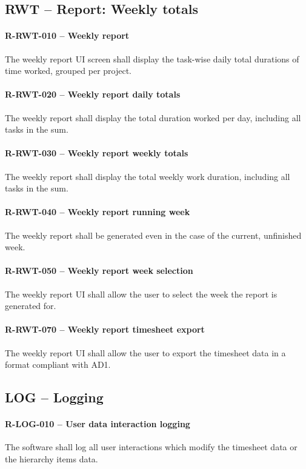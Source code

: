 \subsection{RWT -- Report: Weekly totals}
\paragraph{R-RWT-010 -- Weekly report}
The weekly report \gls{UI} screen shall display the task-wise daily total
durations of time worked, grouped per project.

\paragraph{R-RWT-020 -- Weekly report daily totals}
The weekly report shall display the total duration worked per day, including
all tasks in the sum.

\paragraph{R-RWT-030 -- Weekly report weekly totals}
The weekly report shall display the total weekly work duration, including
all tasks in the sum.

\paragraph{R-RWT-040 -- Weekly report running week}
The weekly report shall be generated even in the case of the current, unfinished
week.

\paragraph{R-RWT-050 -- Weekly report week selection}
The weekly report \gls{UI} shall allow the user to select the week the report is
generated for.

\paragraph{R-RWT-070 -- Weekly report timesheet export}
The weekly report \gls{UI} shall allow the user to export the timesheet data in
a format compliant with AD1.

\subsection{LOG -- Logging}
\paragraph{R-LOG-010 -- User data interaction logging}
The software shall log all user interactions which modify the timesheet
data or the hierarchy items data.

